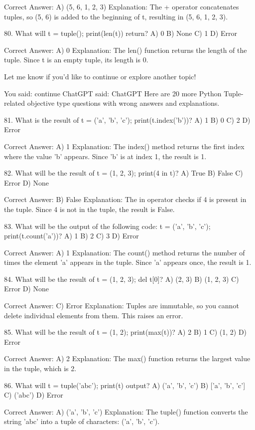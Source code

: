 Correct Answer: A) (5, 6, 1, 2, 3)
Explanation: The + operator concatenates tuples, so (5, 6) is added to the beginning of t, resulting in (5, 6, 1, 2, 3).

80. What will t = tuple(); print(len(t)) return?
A) 0
B) None
C) 1
D) Error

Correct Answer: A) 0
Explanation: The len() function returns the length of the tuple. Since t is an empty tuple, its length is 0.

Let me know if you'd like to continue or explore another topic!






You said:
continue
ChatGPT said:
ChatGPT
Here are 20 more Python Tuple-related objective type questions with wrong answers and explanations.

81. What is the result of t = ('a', 'b', 'c'); print(t.index('b'))?
A) 1
B) 0
C) 2
D) Error

Correct Answer: A) 1
Explanation: The index() method returns the first index where the value 'b' appears. Since 'b' is at index 1, the result is 1.

82. What will be the result of t = (1, 2, 3); print(4 in t)?
A) True
B) False
C) Error
D) None

Correct Answer: B) False
Explanation: The in operator checks if 4 is present in the tuple. Since 4 is not in the tuple, the result is False.

83. What will be the output of the following code: t = ('a', 'b', 'c'); print(t.count('a'))?
A) 1
B) 2
C) 3
D) Error

Correct Answer: A) 1
Explanation: The count() method returns the number of times the element 'a' appears in the tuple. Since 'a' appears once, the result is 1.

84. What will be the result of t = (1, 2, 3); del t[0]?
A) (2, 3)
B) (1, 2, 3)
C) Error
D) None

Correct Answer: C) Error
Explanation: Tuples are immutable, so you cannot delete individual elements from them. This raises an error.

85. What will be the result of t = (1, 2); print(max(t))?
A) 2
B) 1
C) (1, 2)
D) Error

Correct Answer: A) 2
Explanation: The max() function returns the largest value in the tuple, which is 2.

86. What will t = tuple('abc'); print(t) output?
A) ('a', 'b', 'c')
B) ['a', 'b', 'c']
C) ('abc')
D) Error

Correct Answer: A) ('a', 'b', 'c')
Explanation: The tuple() function converts the string 'abc' into a tuple of characters: ('a', 'b', 'c').

